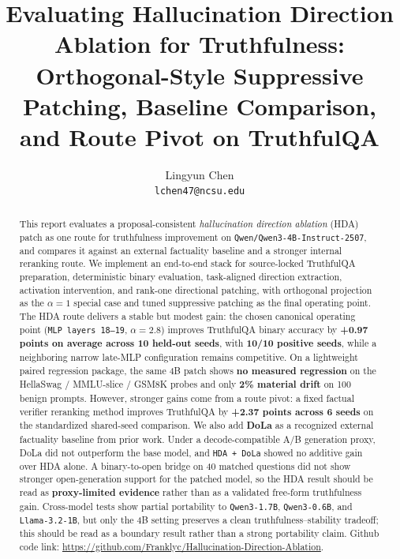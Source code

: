 \documentclass{article}
\title{Evaluating Hallucination Direction Ablation for Truthfulness: Orthogonal-Style Suppressive Patching, Baseline Comparison, and Route Pivot on TruthfulQA}
\author{
  Lingyun Chen \\
  \texttt{lchen47@ncsu.edu}
}
\begin{document}
\maketitle

\begin{abstract}
This report evaluates a proposal-consistent \emph{hallucination direction ablation} (HDA) patch as one route for truthfulness improvement on \texttt{Qwen/Qwen3-4B-Instruct-2507}, and compares it against an external factuality baseline and a stronger internal reranking route. We implement an end-to-end stack for source-locked TruthfulQA preparation, deterministic binary evaluation, task-aligned direction extraction, activation intervention, and rank-one directional patching, with orthogonal projection as the $\alpha = 1$ special case and tuned suppressive patching as the final operating point. The HDA route delivers a stable but modest gain: the chosen canonical operating point (\texttt{MLP layers 18--19}, $\alpha=2.8$) improves TruthfulQA binary accuracy by \textbf{+0.97 points on average across 10 held-out seeds}, with \textbf{10/10 positive seeds}, while a neighboring narrow late-MLP configuration remains competitive. On a lightweight paired regression package, the same 4B patch shows \textbf{no measured regression} on the HellaSwag / MMLU-slice / GSM8K probes and only \textbf{2\% material drift} on 100 benign prompts. However, stronger gains come from a route pivot: a fixed factual verifier reranking method improves TruthfulQA by \textbf{+2.37 points across 6 seeds} on the standardized shared-seed comparison. We also add \textbf{DoLa} as a recognized external factuality baseline from prior work. Under a decode-compatible A/B generation proxy, DoLa did not outperform the base model, and \texttt{HDA + DoLa} showed no additive gain over HDA alone. A binary-to-open bridge on 40 matched questions did not show stronger open-generation support for the patched model, so the HDA result should be read as \textbf{proxy-limited evidence} rather than as a validated free-form truthfulness gain. Cross-model tests show partial portability to \texttt{Qwen3-1.7B}, \texttt{Qwen3-0.6B}, and \texttt{Llama-3.2-1B}, but only the 4B setting preserves a clean truthfulness--stability tradeoff; this should be read as a boundary result rather than a strong portability claim. Github code link: \url{https://github.com/Franklyc/Hallucination-Direction-Ablation}.
\end{abstract}
\end{document}
